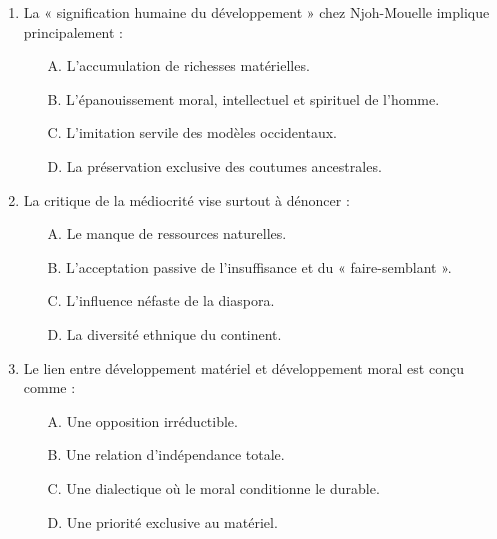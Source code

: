 \documentclass[11pt]{article}
\begin{document}
\begin{exercice}
\begin{enumerate}
    \item La « signification humaine du développement » chez Njoh-Mouelle implique principalement :
    \begin{itemize}
        \item[A.] L'accumulation de richesses matérielles.
        \item[B.] L'épanouissement moral, intellectuel et spirituel de l'homme.
        \item[C.] L'imitation servile des modèles occidentaux.
        \item[D.] La préservation exclusive des coutumes ancestrales.
    \end{itemize}
    \item La critique de la médiocrité vise surtout à dénoncer :
    \begin{itemize}
        \item[A.] Le manque de ressources naturelles.
        \item[B.] L'acceptation passive de l'insuffisance et du « faire-semblant ».
        \item[C.] L'influence néfaste de la diaspora.
        \item[D.] La diversité ethnique du continent.
    \end{itemize}
    \item Le lien entre développement matériel et développement moral est conçu comme :
    \begin{itemize}
        \item[A.] Une opposition irréductible.
        \item[B.] Une relation d'indépendance totale.
        \item[C.] Une dialectique où le moral conditionne le durable.
        \item[D.] Une priorité exclusive au matériel.
    \end{itemize}
\end{enumerate}
\end{exercice}
\end{document}

